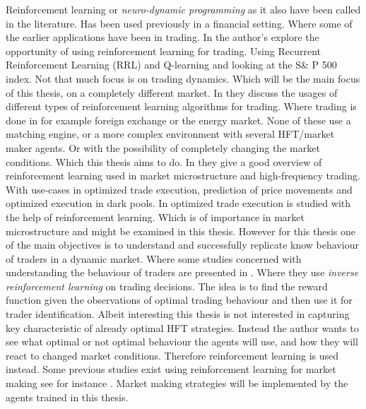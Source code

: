 \documentclass{kththesis}
\theoremstyle{definition}
\begin{document}
Reinforcement learning or \textit{neuro-dynamic programming} as it also have been called in the literature. Has been used previously in a financial setting. Where some of the earlier applications have been in trading. In \textcite{moody1999reinforcement} the author's explore the opportunity of using reinforcement learning for trading. Using Recurrent Reinforcement Learning (RRL) and Q-learning and looking at the S\& P 500 index. Not that much focus is on trading dynamics. Which will be the main focus of  this thesis, on a completely different market. In \parencite{dempster2006automated, du2016algorithm, wang2016reinforcement, casqueiro2006neuro, bertoluzzo2012testing} they discuss the usages of different types of reinforcement learning algorithms for trading. Where trading is done in for example foreign exchange or the energy market. None of these use a matching engine, or a more complex environment with several HFT/market maker agents. Or with the possibility of completely changing the market conditions. Which this thesis aims to do. 
\newline
\newline
In \textcite{kearns2013machine} they give a good overview of reinforcement learning used in market microstructure and high-frequency trading. With use-cases in optimized trade execution, prediction of price movements and optimized execution in dark pools. In \parencite{nevmyvaka2006reinforcement, hendricks2014reinforcement}  optimized trade execution is studied with the help of reinforcement learning. Which is of importance in market microstructure and might be examined in this thesis. However for this thesis one of the main objectives is to understand and successfully replicate know behaviour of traders in a dynamic market. Where some studies concerned with understanding the behaviour of traders are presented in \parencite{yang2014algorithmic, yang2012behavior}. Where they use \textit{inverse reinforcement learning} on trading decisions. 
\newpage
The idea is to find the reward function given the observations of optimal trading behaviour and then use it for trader identification. Albeit interesting this thesis is not interested in capturing key characteristic of already optimal HFT strategies. Instead the author wants to see what optimal or not optimal behaviour the agents will use, and how they will react to changed market conditions. Therefore reinforcement learning is used instead. Some previous studies exist using reinforcement learning for market making see for instance \parencite{jumadinova2010comparison,chan2001electronic, fernandez2015high, sherstov2004three}. Market making strategies will be implemented by the agents trained in this thesis.
\end{document}
